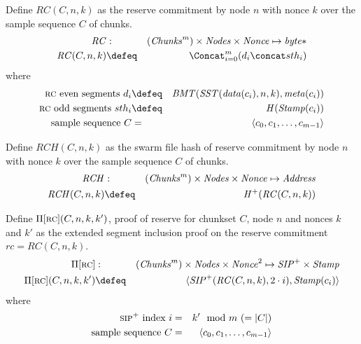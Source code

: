 \begin{definition}
\label{def:RC}
Define $\mathit{RC}(C,n,k)$ as the reserve commitment by node $n$ with nonce $k$ over the sample sequence $C$ of chunks.
\begin{eqnarray}
\mathit{RC}&:&(\mathit{Chunks}^{m})\times\mathit{Nodes}\times\mathit{Nonce}\mapsto\mathit{byte}{*}\\
\mathit{RC}(C,n,k)&\defeq&\Concat_{i=0}^{m}(d_i\concat sth_i)
\end{eqnarray}
where
\begin{eqnarray}
\text{{\sc rc} even segments } 
d_i&\defeq&\mathit{BMT}(\mathit{SST}(\mathit{data}(c_i),n,k), \mathit{meta}(c_i))\\
\text{{\sc rc} odd segments } sth_i&\defeq& \mathit{H}(\mathit{Stamp}(c_i))\\
\text{sample sequence } C&=&\langle c_0, c_1, \ldots, c_{m-1}\rangle
\end{eqnarray}
\end{definition}

\begin{definition}
\label{def:RCH}
Define $\mathit{RCH}(C,n,k)$ as the swarm file hash of reserve commitment by node $n$ with nonce $k$ over the sample sequence $C$ of chunks.
\begin{eqnarray}
\mathit{RCH}&:&(\mathit{Chunks}^{m})\times\mathit{Nodes}\times\mathit{Nonce}\mapsto\mathit{Address}\\
\mathit{RCH}(C,n,k)&\defeq&\mathit{H}^{+}(\mathit{RC}(C,n,k))
\end{eqnarray}
\end{definition}


\begin{definition}
\label{def:RC-proof}
Define $\Pi[\textsc{\lowercase{RC}}](C,n,k,k')$, proof of reserve for chunkset $C$, node $n$ and nonces $k$ and $k'$ as the extended segment inclusion proof on the reserve commitment $rc=\mathit{RC}(C,n,k)$.
\begin{eqnarray}
\Pi[\textsc{\lowercase{RC}}]&:&(\mathit{Chunks}^{m})\times\mathit{Nodes}\times\mathit{Nonce}^2\mapsto\mathit{SIP}^{+}\times\mathit{Stamp}\\
\Pi[\textsc{\lowercase{RC}}](C,n,k,k')&\defeq&\langle\mathit{SIP}^{+}(\mathit{RC}(C,n,k),2\cdot i), \mathit{Stamp}(c_i)\rangle
\end{eqnarray}
where
\begin{eqnarray}
\textsc{sip}^{+}\text{ index } i&=&k' \mod m\ (=\lvert C\rvert)\\
\text{sample sequence } C&=&\langle c_0, c_1, \ldots, c_{m-1}\rangle
\end{eqnarray}
\end{definition}

